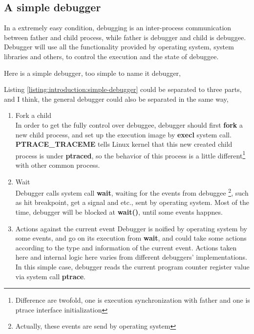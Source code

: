 \documentclass[12pt]{book}
\begin{document}
\begin{CJK}{UTF8}{gbsn}
\section{A simple debugger}
In a extremely easy condition, debugging is an inter-process communication 
between father and child process, while father is debugger and child is debuggee.
Debugger will use all the functionality provided by operating system, system 
libraries and others, to control the execution and the state of debuggee.

Here is a simple debugger, too simple to name it debugger,




Listing \ref{listing:introduction:simple-debugger} could be separated to three parts, and I think, the general debugger could also be separated in the same way,
\begin{enumerate}
\item Fork a child\\
In order to get the fully control over debuggee, debugger should first 
\textbf{fork} a new child process, and set up the execution image by \textbf{execl} system call.  
\textbf{PTRACE\_TRACEME} tells Linux kernel that this new created child process 
is under \textbf{ptraced}, so the behavior of this process is a little 
different\footnote{Difference are twofold, one is execution synchronization 
with father and one is ptrace interface initialization} with other common process.

\item Wait \\
Debugger calls system call \textbf{wait}, waiting for the events from debuggee
\footnote{Actually, these events are send by operating system}, such as 
hit breakpoint, get a signal and etc., sent by operating system.  Most of the time, 
debugger will be blocked at \textbf{wait()}, until some events happnes.

\item Actions against the current event
Debugger is noified by operating system by some events, and go on its execution 
from \textbf{wait}, and could take some actions according to the type and information 
of the current event.
Actions taken here and internal logic here varies from different debuggers' implementations.  
In this simple case, debugger reads the current program counter register value 
via system call \textbf{ptrace}.
\end{enumerate}



\end{CJK}
\end{document}
